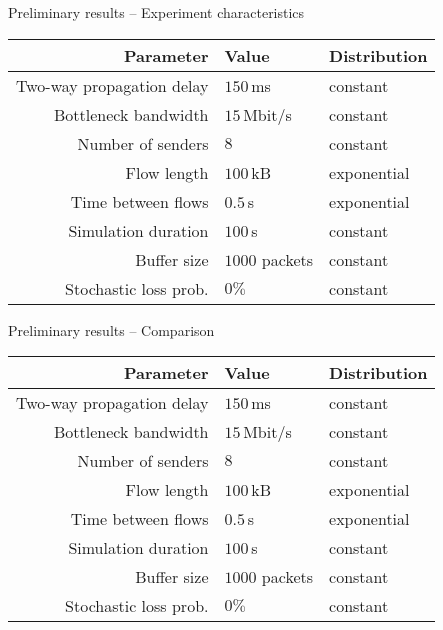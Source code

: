 \documentclass[11pt]{beamer}
\begin{document}
\begin{frame}{Preliminary results -- Experiment characteristics}
\centering
\begin{tabular}{rll}
\toprule
Parameter & Value & Distribution \\
\midrule
Two-way propagation delay & $150\,$ms & constant \\
Bottleneck bandwidth & $15\,$Mbit/s & constant \\
Number of senders & $8$ & constant \\
Flow length & $100\,$kB & exponential \\
Time between flows & $0.5\,$s & exponential \\
Simulation duration & $100\,$s & constant \\
Buffer size & $1000$ packets & constant \\
Stochastic loss prob. & $0\%$ & constant \\
\bottomrule
\end{tabular}
\end{frame}

\begin{frame}{Preliminary results -- Comparison}
\centering
\begin{tabular}{rll}
\toprule
Parameter & Value & Distribution \\
\midrule
Two-way propagation delay & $150\,$ms & constant \\
Bottleneck bandwidth & $15\,$Mbit/s & constant \\
Number of senders & $8$ & constant \\
Flow length & $100\,$kB & exponential \\
Time between flows & $0.5\,$s & exponential \\
Simulation duration & $100\,$s & constant \\
Buffer size & $1000$ packets & constant \\
Stochastic loss prob. & $0\%$ & constant \\
\bottomrule
\end{tabular}
\end{frame}
\end{document}
